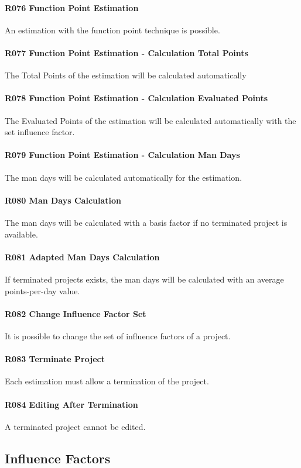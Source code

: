 \paragraph{R076 Function Point Estimation}
An estimation with the function point technique is possible.
\paragraph{R077 Function Point Estimation - Calculation Total Points}
The Total Points of the estimation will be calculated automatically
\paragraph{R078 Function Point Estimation - Calculation Evaluated Points}
The Evaluated Points of the estimation will be calculated automatically with the set influence factor.
\paragraph{R079 Function Point Estimation - Calculation Man Days}
The man days will be calculated automatically for the estimation.
\paragraph{R080 Man Days Calculation}
The man days will be calculated with a basis factor if no terminated project is available.
\paragraph{R081 Adapted Man Days Calculation}
If terminated projects exists, the man days will be calculated with an average points-per-day value.
\paragraph{R082 Change Influence Factor Set}
It is possible to change the set of influence factors of a project.
\paragraph{R083 Terminate Project}
Each estimation must allow a termination of the project.
\paragraph{R084 Editing After Termination}
A terminated project cannot be edited.
 
\subsection{Influence Factors} 

